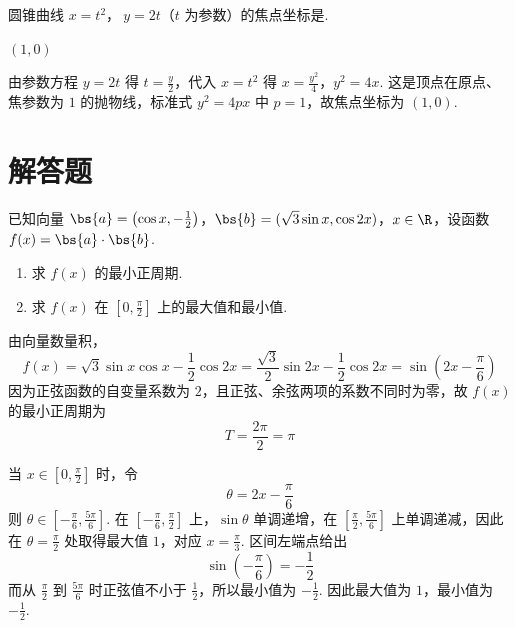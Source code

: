 \begin{problem}
圆锥曲线 \(x = t^{2}\)，\(\ y = 2t\)（\(t\) 为参数）的焦点坐标是\fillinblank{}.
\end{problem}

\begin{answer}
\((1, 0)\)
\end{answer}

\begin{solution}
由参数方程 \(y=2t\) 得 \(t=\frac y2\)，代入 \(x=t^2\) 得
\(x=\frac{y^2}{4}\)，\(y^2=4x\).
这是顶点在原点、焦参数为 \(1\) 的抛物线，标准式 \(y^2=4px\) 中 \(p=1\)，故焦点坐标为 \((1,0)\).
\end{solution}

\section{解答题}

\begin{problem}
已知向量 \(\bs{a} = \left(\cos x, -\frac{1}{2}\right)\)，\(\bs{b} = (\sqrt{3} \sin x, \cos 2x)\)，\(x \in \R\)，设函数 \(f(x) = \bs{a} \cdot \bs{b}\).

\begin{enumerate}
\item 求 \( f(x) \) 的最小正周期.
\item 求 \( f(x) \) 在 \( \left[0, \frac{\pi}{2}\right] \) 上的最大值和最小值.
\end{enumerate}
\end{problem}

\begin{solution}
由向量数量积，
\[
f(x)=\sqrt{3}\sin x\cos x-\frac12\cos2x
     =\frac{\sqrt{3}}2\sin2x-\frac12\cos2x
     =\sin\left(2x-\frac{\pi}{6}\right)
\]
因为正弦函数的自变量系数为 \(2\)，且正弦、余弦两项的系数不同时为零，故 \(f(x)\) 的最小正周期为
\[
T=\frac{2\pi}{2}=\pi
\]

当 \(x\in\left[0,\frac{\pi}{2}\right]\) 时，令
\[
\theta=2x-\frac{\pi}{6}
\]
则 \(\theta\in\left[-\frac{\pi}{6},\frac{5\pi}{6}\right]\). 在 \(\left[-\frac{\pi}{6},\frac{\pi}{2}\right]\) 上，\(\sin\theta\) 单调递增，在 \(\left[\frac{\pi}{2},\frac{5\pi}{6}\right]\) 上单调递减，因此在 \(\theta=\frac{\pi}{2}\) 处取得最大值 \(1\)，对应 \(x=\frac{\pi}{3}\). 区间左端点给出
\[
\sin\left(-\frac{\pi}{6}\right)=-\frac12
\]
而从 \(\frac{\pi}{2}\) 到 \(\frac{5\pi}{6}\) 时正弦值不小于 \(\frac12\)，所以最小值为 \(-\frac12\). 因此最大值为 \(1\)，最小值为 \(-\frac12\).
\end{solution}

